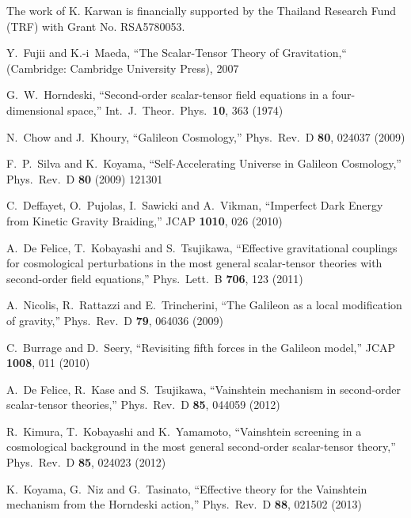 \documentclass[aps,prd,amsmath,amssymb,preprintnumbers,onecolumn,11pt,nofootinbib]{revtex4}
\begin{document}
\acknowledgments
The work of K. Karwan is financially supported by the Thailand Research Fund (TRF) with Grant No. RSA5780053.

\begin{thebibliography}{50}

  Y.~Fujii and K.-i~Maeda, ``The Scalar-Tensor Theory of Gravitation,`` (Cambridge: Cambridge University Press), 2007
  
  G.~W.~Horndeski, ``Second-order scalar-tensor field equations in a four-dimensional space,''
  Int.\ J.\ Theor.\ Phys.\  {\bf 10}, 363 (1974)

  N.~Chow and J.~Khoury, ``Galileon Cosmology,''
  Phys.\ Rev.\ D {\bf 80}, 024037 (2009)
  
  F.~P.~Silva and K.~Koyama, ``Self-Accelerating Universe in Galileon Cosmology,''
  Phys.\ Rev.\ D {\bf 80} (2009) 121301
  
  C.~Deffayet, O.~Pujolas, I.~Sawicki and A.~Vikman, ``Imperfect Dark Energy from Kinetic Gravity Braiding,''
  JCAP {\bf 1010}, 026 (2010)
  
  A.~De Felice, T.~Kobayashi and S.~Tsujikawa, ``Effective gravitational couplings for cosmological perturbations in the most general scalar-tensor theories with second-order field equations,''
  Phys.\ Lett.\ B {\bf 706}, 123 (2011)
  
  A.~Nicolis, R.~Rattazzi and E.~Trincherini, ``The Galileon as a local modification of gravity,''
  Phys.\ Rev.\ D {\bf 79}, 064036 (2009)
  
  C.~Burrage and D.~Seery, ``Revisiting fifth forces in the Galileon model,''
  JCAP {\bf 1008}, 011 (2010)
  
  A.~De Felice, R.~Kase and S.~Tsujikawa, ``Vainshtein mechanism in second-order scalar-tensor theories,''
  Phys.\ Rev.\ D {\bf 85}, 044059 (2012)
  
  R.~Kimura, T.~Kobayashi and K.~Yamamoto, ``Vainshtein screening in a cosmological background in the most general second-order scalar-tensor theory,''
  Phys.\ Rev.\ D {\bf 85}, 024023 (2012)
  
  K.~Koyama, G.~Niz and G.~Tasinato, ``Effective theory for the Vainshtein mechanism from the Horndeski action,''
  Phys.\ Rev.\ D {\bf 88}, 021502 (2013)
  

\end{thebibliography}
\end{document}
